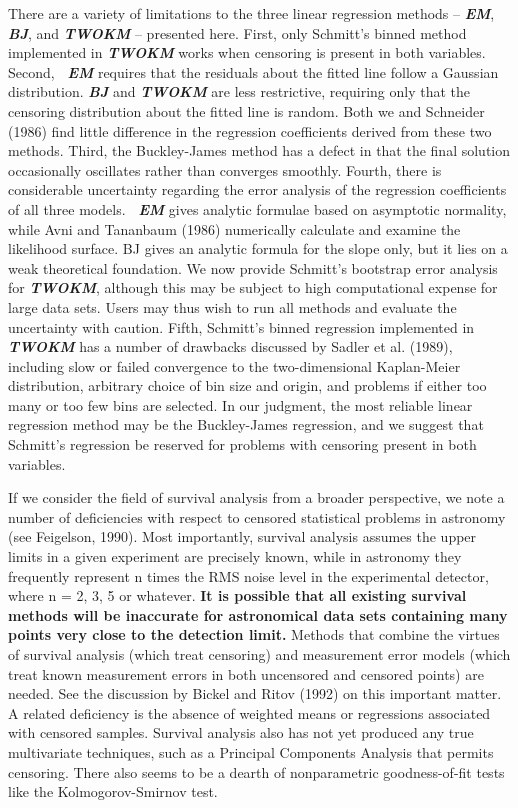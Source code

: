      There are a variety of limitations to the three linear regression
methods -- {\sl\bf EM}, {\sl\bf BJ}, and {\sl\bf TWOKM} -- presented here.   
First, only Schmitt's binned method implemented in {\sl\bf TWOKM} works when 
censoring is present in both variables.  Second, {\sl\bf\ EM} requires that 
the  residuals about the fitted line follow a Gaussian distribution.  
{\sl\bf BJ} and {\sl\bf TWOKM} are less restrictive, requiring only that the 
censoring distribution about the fitted line is random.  Both we and 
Schneider (1986) find little difference in the regression 
coefficients derived from these two methods.  Third, the Buckley-James
method has a defect in that the final solution occasionally oscillates
rather than converges smoothly.  Fourth, there is considerable uncertainty 
regarding the error analysis of the regression coefficients of all three 
models.  {\sl\bf\ EM} gives analytic formulae based on asymptotic normality, 
while Avni and Tananbaum (1986) numerically calculate and examine the 
likelihood surface.  BJ gives an analytic formula for the slope only, but it 
lies on a weak theoretical foundation.  We now provide Schmitt's bootstrap 
error analysis for {\sl\bf TWOKM}, although this may be subject to high 
computational expense for large data sets.  Users may thus wish to run 
all methods and evaluate the uncertainty with caution.  Fifth, Schmitt's
binned regression implemented in {\sl\bf TWOKM} has a number of drawbacks
discussed by Sadler et al. (1989), including slow or failed convergence
to the two-dimensional Kaplan-Meier distribution, arbitrary choice of
bin size and origin, and problems if either too many or too few bins are
selected.  In our judgment, the most reliable linear regression method
may be the Buckley-James regression, and we suggest that Schmitt's regression
be reserved for problems with censoring present in both variables. 

    If we consider the field of survival analysis from a broader
perspective, we note a number of deficiencies with respect to censored 
statistical problems in astronomy (see Feigelson, 1990).  Most importantly, 
survival analysis assumes the upper limits in a given experiment are 
precisely known, while in astronomy they frequently represent n times 
the RMS noise level in the experimental detector, where n = 2, 3, 5 
or whatever.  {\bf It is possible that all existing survival methods will
be inaccurate for astronomical data sets containing many points very close
to the detection limit.}  Methods that combine the virtues of survival
analysis (which treat censoring) and measurement error models (which
treat known measurement errors in both uncensored and censored points)
are needed. See the discussion by Bickel and Ritov (1992) on this important
matter.  A related deficiency is the absence of 
weighted means or regressions associated with censored samples.
Survival analysis also has not yet produced any true multivariate 
techniques, such as a Principal Components Analysis that permits 
censoring.  There also seems to be a  dearth of nonparametric 
goodness-of-fit tests like the Kolmogorov-Smirnov test.

